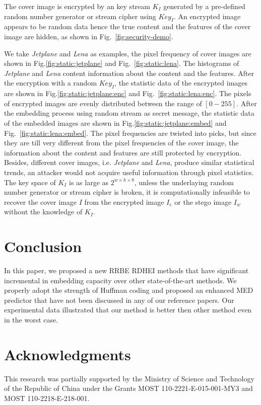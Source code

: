 \documentclass{elsarticle}
\begin{document}
	The cover image is encrypted by an key stream \(K_I\) generated by a pre-defined random number generator or stream cipher using \(Key_I\).
	An encrypted image appears to be random data hence the true content and the features of the cover image are hidden, as shown in Fig.~\ref{fig:security-demo}.
	
	We take \emph{Jetplane} and \emph{Lena} as examples, the pixel frequency of cover images are shown in Fig.\ref{fig:static:jetplane} and Fig.~\ref{fig:static:lena}.
	The histograms of \emph{Jetplane} and \emph{Lena} content information about the content and the features.
	After the encryption with a random \(Key_I\), the statistic data of the encrypted images are shown in Fig.\ref{fig:static:jetplane:enc} and Fig.~\ref{fig:static:lena:enc}.
	The pixels of encrypted images are evenly distributed between the range of \([0-255]\).
	After the embedding process using random stream as secret message, the statistic data of the embedded images are shown in Fig.\ref{fig:static:jetplane:embed} and Fig.~\ref{fig:static:lena:embed}.
	The pixel frequencies are twisted into picks, but since they are till very different from the pixel frequencies of the cover image, the information about the content and features are still protected by encryption. 
	Besides, different cover images, i.e. \emph{Jetplane} and \emph{Lena}, produce similar statistical trends, an attacker would not acquire useful information through pixel statistics.
	The key space of \(K_I\) is as large as \(2^{w \times h \times 8}\), unless the underlaying random number generator or stream cipher is broken, it is computationally infeasible to recover the cover image \(I\) from the encrypted image \(I_e\) or the stego image \(I_w\) without the knowledge of \(K_I\).
	
	
	\section{Conclusion}
	\label{sec:conclusion}
	
	In this paper, we proposed a new RRBE RDHEI methods that have significant incremental in embedding capacity over other state-of-the-art methods.
	We properly adopt the strength of Huffman coding and proposed an enhanced MED predictor that have not been discussed in any of our reference papers.
	Our experimental data illustrated that our method is better then other method even in the worst case. 
	
	\section*{Acknowledgments}
	\noindent
	This research was partially supported by the Ministry of Science and Technology of the Republic of China under the Grants MOST 110-2221-E-015-001-MY3 and MOST 110-2218-E-218-001.
	
	
	
	
	
\end{document}

